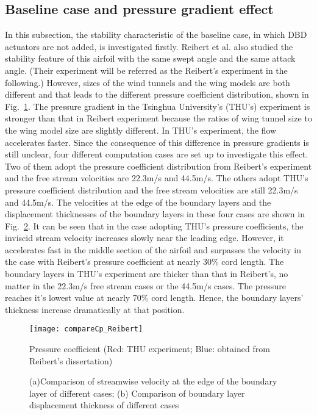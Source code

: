 \documentclass{AIAA}
\begin{document}
\subsection{Baseline case and pressure gradient effect}
In this subsection, the stability characteristic of the baseline case, in which DBD actuators are not added, is investigated firstly. Reibert et al. \cite{Reiberit1996} also studied the stability feature of this airfoil with the same swept angle and the same attack angle. (Their experiment will be referred as the Reibert's experiment in the following.) However, sizes of the wind tunnels and the wing models are both different and that leads to the different pressure coefficient distribution, shown in Fig.~\ref{f:CpCompare}. The pressure gradient in the Tsinghua University's (THU's) experiment is stronger than that in Reibert experiment because the ratios of wing tunnel size to the wing model size are slightly different. In THU's experiment, the flow accelerates faster. Since the consequence of this difference in pressure gradients is still unclear, four different computation cases are set up to investigate this effect. Two of them adopt the pressure coefficient distribution from Reibert's experiment and the free stream velocities are 22.3m/s and 44.5m/s. The others adopt THU's pressure coefficient distribution and the free stream velocities are still 22.3m/s and 44.5m/s. The velocities at the edge of the boundary layers and the displacement thicknesses of the boundary layers in these four cases are shown in Fig.~\ref{fig:CompOutFlow}. It can be seen that in the case adopting THU's pressure coefficients, the inviscid stream velocity increases slowly near the leading edge. However, it accelerates fast in the middle section of the airfoil and surpasses the velocity in the case with Reibert's pressure coefficient at nearly 30\% cord length. The boundary layers in THU's experiment are thicker than that in Reibert's, no matter in the 22.3m/s free stream cases or the 44.5m/s cases. The pressure reaches it's lowest value at nearly 70\% cord length. Hence, the boundary layers' thickness increase dramatically at that position.
\begin{figure}
\centering
  \texttt{[image: compareCp\_Reibert]}
  \caption{Pressure coefficient (Red: THU experiment; Blue: obtained from Reibert's dissertation\cite{Reiberit1996})}\label{f:CpCompare}
\end{figure}
\begin{figure}
\centering
{}
\caption{(a)Comparison of streamwise velocity at the edge of the boundary layer of different cases; (b) Comparison of boundary layer displacement thickness of different cases}
\label{fig:CompOutFlow} %
\end{figure}
\end{document}
